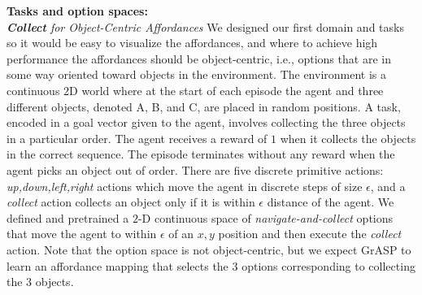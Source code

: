 \documentclass[nohyperref]{article}
\theoremstyle{plain}
\theoremstyle{definition}
\theoremstyle{remark}
\newcommand{\grasp}{{G}r{ASP} }
\renewcommand{\paragraph}[1]{\textbf{#1}\ }
\begin{document}
\paragraph{Tasks and option spaces:}~\\ 
\emph{\textbf{Collect} for Object-Centric Affordances} We designed our first %
domain and tasks so it would be easy to visualize the affordances, and where to achieve high performance the affordances should be object-centric, i.e., options that are in some way oriented toward objects in the environment.
The environment is a continuous 2D world %
where at the start of each episode the agent and three different objects, denoted A, B, and C, are placed in random positions.  A task, encoded in a goal vector given to the agent, involves collecting the three objects in a particular order. The agent receives a reward of $1$ when it collects the  objects in the correct sequence. The episode terminates without any reward when the agent picks an object out of order.
There are five discrete primitive actions: \textit{up,down,left,right} actions which move the agent in discrete steps of size $\epsilon$, and a \textit{collect} action collects an object only if it is within $\epsilon$ distance of the agent.
We defined and pretrained a $2$-D continuous space of \emph{navigate-and-collect} options that move the agent to within $\epsilon$ of an $x,y$ position and then execute the \emph{collect} action. Note that the option space is not object-centric, but we expect \grasp to learn an affordance mapping that selects the $3$ options corresponding to collecting the $3$ objects. 

\end{document}
